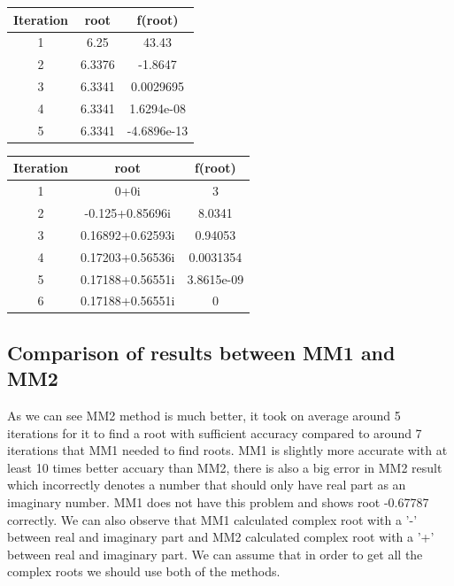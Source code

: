 \documentclass[12pt]{report}
\begin{document}
\begin{center}
  \begin{tabular}{| c  c c |}
\hline
Iteration & root         & f(root) \\
\hline
1   &     6.25    &       43.43 \\
\hline
2   &   6.3376    &     -1.8647 \\
\hline
3   &  6.3341     &  0.0029695 \\
\hline
4   &   6.3341    &  1.6294e-08 \\
\hline
5   &   6.3341    & -4.6896e-13 \\
\hline
\hline

\end{tabular}
\end{center}

\begin{center}
  \begin{tabular}{| c  c c |}
\hline
Iteration & root         & f(root) \\
\hline
1   &         0+0i          &            3 \\
\hline
2   &    -0.125+0.85696i    &       8.0341 \\
\hline
3   &   0.16892+0.62593i    &      0.94053 \\
\hline
4   &   0.17203+0.56536i    &    0.0031354  \\
\hline
5   &   0.17188+0.56551i    &   3.8615e-09  \\
\hline
6   &   0.17188+0.56551i    &            0  \\
\hline
\hline

\end{tabular}
\end{center}

\subsection{Comparison of results between MM1 and MM2}
As we can see MM2 method is much better, it took on average around 5 iterations for it to find a root with sufficient accuracy compared to around 7 iterations that MM1 needed to find roots.  MM1 is slightly more accurate with at least 10 times better accuary than MM2, there is also a big error in MM2 result which incorrectly denotes a number that should only have real part as an imaginary number. MM1 does not have this problem and shows root -0.67787 correctly. We can also observe that MM1 calculated complex root with a '-' between real and imaginary part and MM2 calculated complex root with a '+' between real and imaginary part. We can assume that in order to get all the complex roots we should use both of the methods.
\end{document}
